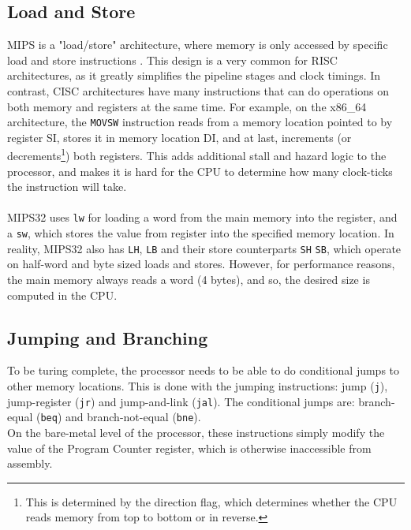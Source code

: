 \subsection{Load and Store}
MIPS is a "load/store" architecture, where memory is only accessed by specific
load and store instructions \cite{flynn1995computer}. This design is a very
common for RISC architectures, as it greatly simplifies the pipeline stages and
clock timings. In contrast, CISC architectures have many instructions that can
do operations on both memory and registers at the same time. For example, on
the x86\_64 architecture, the
\texttt{MOVSW} instruction reads from a memory location pointed to by register
SI, stores it in memory location DI, and at last, increments (or
decrements\footnote{This is determined by the direction flag, which determines
whether the CPU reads memory from top to bottom or in reverse.})
both registers\cite{intelmanual}. This adds additional stall and hazard logic to
the processor, and makes it is hard for the CPU to determine how many
clock-ticks the instruction will take.\\\\
MIPS32 uses \texttt{lw} for loading a word from the main memory into the register,
and a \texttt{sw}, which stores the value from register into the specified
memory location. In reality, MIPS32 also has \texttt{LH}, \texttt{LB} and
their store counterparts \texttt{SH} \texttt{SB}, which operate on half-word
and byte sized loads and stores. However, for performance reasons, the main
memory always reads a word (4 bytes), and so, the desired size is computed in
the CPU.



\subsection{Jumping and Branching}
To be turing complete, the processor needs to be able to do conditional jumps
to other memory locations. This is done with the jumping instructions: jump
(\texttt{j}), jump-register (\texttt{jr}) and jump-and-link (\texttt{jal}). The
conditional jumps are: branch-equal (\texttt{beq}) and branch-not-equal
(\texttt{bne}).\\
On the bare-metal level of the processor, these instructions simply modify the
value of the Program Counter register, which is otherwise inaccessible from
assembly.


